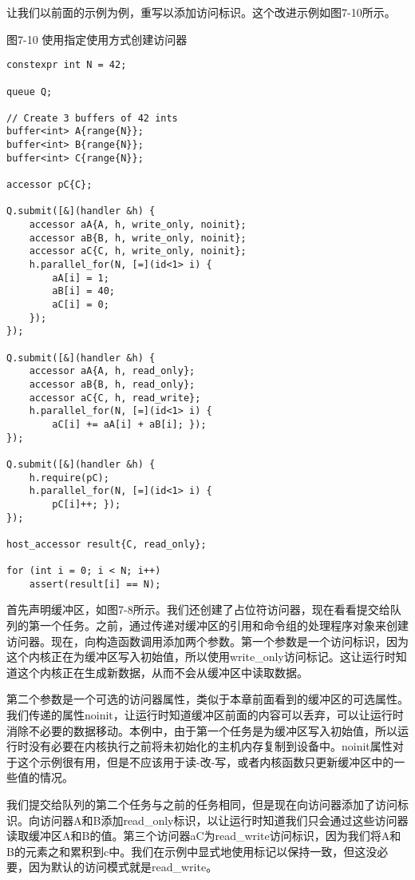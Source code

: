 让我们以前面的示例为例，重写以添加访问标识。这个改进示例如图7-10所示。\par

\hspace*{\fill} \par %
图7-10 使用指定使用方式创建访问器
\begin{lstlisting}[caption={}]
constexpr int N = 42;

queue Q;

// Create 3 buffers of 42 ints
buffer<int> A{range{N}};
buffer<int> B{range{N}};
buffer<int> C{range{N}};

accessor pC{C};

Q.submit([&](handler &h) {
	accessor aA{A, h, write_only, noinit};
	accessor aB{B, h, write_only, noinit};
	accessor aC{C, h, write_only, noinit};
	h.parallel_for(N, [=](id<1> i) {
		aA[i] = 1;
		aB[i] = 40;
		aC[i] = 0;
	});
});

Q.submit([&](handler &h) {
	accessor aA{A, h, read_only};
	accessor aB{B, h, read_only};
	accessor aC{C, h, read_write};
	h.parallel_for(N, [=](id<1> i) {
		aC[i] += aA[i] + aB[i]; });
});

Q.submit([&](handler &h) {
	h.require(pC);
	h.parallel_for(N, [=](id<1> i) {
		pC[i]++; });
});

host_accessor result{C, read_only};

for (int i = 0; i < N; i++)
	assert(result[i] == N);
\end{lstlisting}

首先声明缓冲区，如图7-8所示。我们还创建了占位符访问器，现在看看提交给队列的第一个任务。之前，通过传递对缓冲区的引用和命令组的处理程序对象来创建访问器。现在，向构造函数调用添加两个参数。第一个参数是一个访问标识，因为这个内核正在为缓冲区写入初始值，所以使用write\_only访问标记。这让运行时知道这个内核正在生成新数据，从而不会从缓冲区中读取数据。\par

第二个参数是一个可选的访问器属性，类似于本章前面看到的缓冲区的可选属性。我们传递的属性noinit，让运行时知道缓冲区前面的内容可以丢弃，可以让运行时消除不必要的数据移动。本例中，由于第一个任务是为缓冲区写入初始值，所以运行时没有必要在内核执行之前将未初始化的主机内存复制到设备中。noinit属性对于这个示例很有用，但是不应该用于读-改-写，或者内核函数只更新缓冲区中的一些值的情况。\par

我们提交给队列的第二个任务与之前的任务相同，但是现在向访问器添加了访问标识。向访问器A和B添加read\_only标识，以让运行时知道我们只会通过这些访问器读取缓冲区A和B的值。第三个访问器aC为read\_write访问标识，因为我们将A和B的元素之和累积到c中。我们在示例中显式地使用标记以保持一致，但这没必要，因为默认的访问模式就是read\_write。\par

